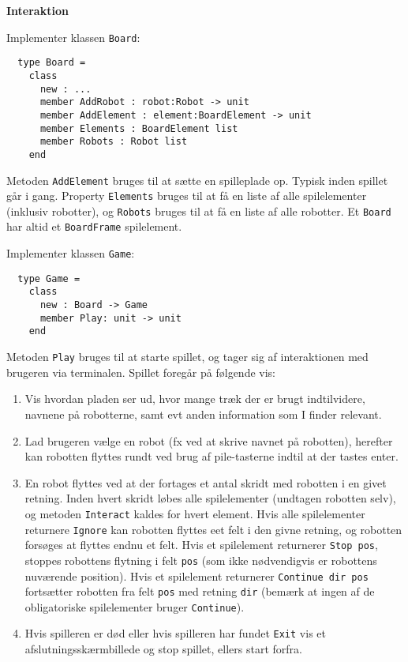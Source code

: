 \textbf{Interaktion}

Implementer klassen \lstinline{Board}:

\begin{lstlisting}
  type Board =
    class
      new : ...
      member AddRobot : robot:Robot -> unit
      member AddElement : element:BoardElement -> unit
      member Elements : BoardElement list
      member Robots : Robot list
    end
\end{lstlisting}

Metoden \lstinline{AddElement} bruges til at sætte en spilleplade
op. Typisk inden spillet går i gang. Property \lstinline{Elements}
bruges til at få en liste af alle spilelementer (inklusiv robotter),
og \lstinline{Robots} bruges til at få en liste af alle robotter. Et
\lstinline{Board} har altid et \lstinline{BoardFrame} spilelement.

Implementer klassen \lstinline{Game}:

\begin{lstlisting}
  type Game =
    class
      new : Board -> Game
      member Play: unit -> unit
    end
\end{lstlisting}



Metoden \lstinline{Play} bruges til at starte spillet, og tager sig af
interaktionen med brugeren via terminalen. Spillet
foregår på følgende vis:
\begin{enumerate}
 \item Vis hvordan pladen ser ud, hvor mange træk der er brugt
  indtilvidere, navnene på robotterne, samt evt anden information som
  I finder relevant.
\item Lad brugeren vælge en robot (fx ved at skrive navnet på
  robotten), herefter kan robotten flyttes rundt ved brug af
  pile-tasterne indtil at der tastes enter.
\item En robot flyttes ved at der fortages et antal skridt med
  robotten i en givet retning. Inden hvert skridt løbes alle
  spilelementer (undtagen robotten selv), og metoden
  \lstinline{Interact} kaldes for hvert element. Hvis alle
  spilelementer
  returnere \lstinline{Ignore} kan robotten flyttes eet felt i den
  givne retning, og robotten forsøges at flyttes endnu et felt. Hvis
  et spilelement returnerer \lstinline{Stop pos}, stoppes robottens
  flytning i felt \lstinline{pos} (som ikke nødvendigvis er robottens
  nuværende position). Hvis et spilelement returnerer
  \lstinline{Continue dir pos} fortsætter robotten fra felt
  \lstinline{pos} med retning \lstinline{dir} (bemærk at ingen af de
  obligatoriske spilelementer bruger \lstinline{Continue}).

\item Hvis spilleren er død eller hvis spilleren har fundet
  \lstinline{Exit} vis et afslutningsskærmbillede og stop
  spillet, ellers start forfra.
\end{enumerate}

